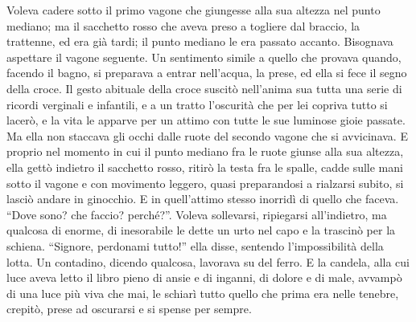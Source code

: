 Voleva cadere sotto il primo vagone che giungesse alla sua altezza nel punto mediano; ma il sacchetto rosso che aveva preso a togliere dal braccio, la trattenne, ed era già tardi; il punto mediano le era passato accanto. Bisognava aspettare il vagone seguente. Un sentimento simile a quello che provava quando, facendo il bagno, si preparava a entrar nell'acqua, la prese, ed ella si fece il segno della croce. Il gesto abituale della croce suscitò nell'anima sua tutta una serie di ricordi verginali e infantili, e a un tratto l'oscurità che per lei copriva tutto si lacerò, e la vita le apparve per un attimo con tutte le sue luminose gioie passate. Ma ella non staccava gli occhi dalle ruote del secondo vagone che si avvicinava. E proprio nel momento in cui il punto mediano fra le ruote giunse alla sua altezza, ella gettò indietro il sacchetto rosso, ritirò la testa fra le spalle, cadde sulle mani sotto il vagone e con movimento leggero, quasi preparandosi a rialzarsi subito, si lasciò andare in ginocchio. E in quell'attimo stesso inorridì di quello che faceva. ``Dove sono? che faccio? perché?''. Voleva sollevarsi, ripiegarsi all'indietro, ma qualcosa di enorme, di inesorabile le dette un urto nel capo e la trascinò per la schiena. ``Signore, perdonami tutto!'' ella disse, sentendo l'impossibilità della lotta. Un contadino, dicendo qualcosa, lavorava su del ferro. E la candela, alla cui luce aveva letto il libro pieno di ansie e di inganni, di dolore e di male, avvampò di una luce più viva che mai, le schiarì tutto quello che prima era nelle tenebre, crepitò, prese ad oscurarsi e si spense per sempre. 
 
